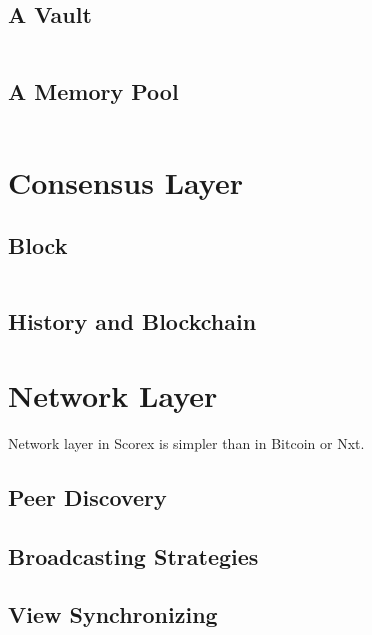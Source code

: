 \documentclass[]{report}   %
\begin{document}
\subsection{A Vault}

\begin{lstlisting}
\end{lstlisting}

\subsection{A Memory Pool}

\begin{lstlisting}
\end{lstlisting}


\section{Consensus Layer}

\subsection{Block}

\begin{lstlisting}

\end{lstlisting}

\subsection{History and Blockchain}

\section{Network Layer}

Network layer in Scorex is simpler than in Bitcoin or Nxt. 

\subsection{Peer Discovery}

\subsection{Broadcasting Strategies}

\subsection{View Synchronizing}
\end{document}
